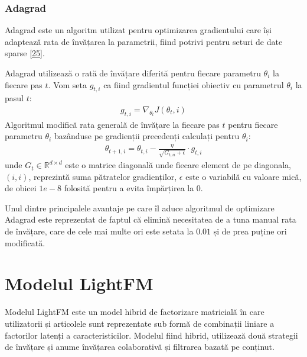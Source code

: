 \subsubsection{Adagrad}
Adagrad este un algoritm utilizat pentru optimizarea gradientului care își adaptează rata de învățarea la parametrii, fiind potrivi pentru seturi de date sparse \hyperlink{adagrad}{[25]}. 

Adagrad utilizează o rată de învățare diferită pentru fiecare parametru $\theta_i$ la fiecare pas $t$. Vom seta $g_{t,i}$ ca fiind gradientul funcției obiectiv cu parametrul $\theta_i$ la pasul $t$:
\begin{align}
	g_{t,i} = \nabla_{\theta_t}J(\theta_t, i)
\end{align}
Algoritmul modifică rata generală de învățare la fiecare pas $t$ pentru fiecare parametru $\theta_i$ bazânduse pe gradienții precedenți calculați pentru $\theta_i$:
\begin{align}
	\theta_{t+1,i} = \theta_{t,i} - \frac{\eta}{\sqrt{G_{t,ii} + \epsilon}} \cdot g_{t,i}
\end{align}
unde $G_t \in \mathbb{R}^{d \times d}$ este o matrice diagonală unde fiecare element de pe diagonala, $(i,i)$, reprezintă suma pătratelor gradienților, $\epsilon$ este o variabilă cu valoare mică, de obicei $1e-8$ folosită pentru a evita împărțirea la 0.

Unul dintre principalele avantaje pe care îl aduce algoritmul de optimizare Adagrad este reprezentat de faptul că elimină necesitatea de a tuna manual rata de învățare, care de cele mai multe ori este setata la $0.01$ și de prea puține ori modificată.

\section{Modelul LightFM}
Modelul LightFM este un model hibrid de factorizare matricială în care utilizatorii și articolele sunt reprezentate sub formă de combinații liniare a factorilor latenți a caracteristicilor. Modelul fiind hibrid, utilizează două strategii de învățare și anume învățarea colaborativă și filtrarea bazată pe conținut.

